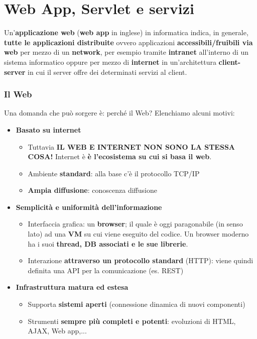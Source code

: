 \documentclass[12pt]{article}
\begin{document}
\section{Web App, Servlet e servizi}
Un'\textbf{applicazione web} (\textbf{web app} in inglese) in informatica indica, in generale, \textbf{tutte le applicazioni distribuite}
ovvero applicazioni \textbf{accessibili/fruibili via web} per mezzo di un \textbf{network}, per esempio tramite \textbf{intranet} all'interno di un sistema informatico
oppure per mezzo di \textbf{internet} in un'architettura \textbf{client-server} in cui il server offre dei determinati servizi al client.
\subsubsection{Il Web}
Una domanda che può sorgere è: perché il Web? Elenchiamo alcuni motivi:
\begin{itemize}
    \item \textbf{Basato su internet}
    \begin{itemize}
        \item Tuttavia \textbf{IL WEB E INTERNET NON SONO LA STESSA COSA!} Internet è \textbf{è l'ecosistema su cui si basa il web}.
        \item Ambiente \textbf{standard}: alla base c'è il protocollo TCP/IP
        \item \textbf{Ampia diffusione}: conoscenza diffusione
    \end{itemize}
    \newpage
    \item \textbf{Semplicità e uniformità dell'informazione}
    \begin{itemize}
        \item Interfaccia grafica: un \textbf{browser}; il quale è oggi paragonabile (in senso lato) ad una \textbf{VM} su cui viene eseguito del codice.
        Un browser moderno ha i suoi \textbf{thread, DB associati e le sue librerie}.
        \item Interazione \textbf{attraverso un protocollo standard} (HTTP): viene quindi definita una API per la comunicazione (es. REST)
    \end{itemize}
    \item \textbf{Infrastruttura matura ed estesa}
    \begin{itemize}
        \item Supporta \textbf{sistemi aperti} (connessione dinamica di nuovi componenti)
        \item Strumenti \textbf{sempre più completi e potenti}: evoluzioni di HTML, AJAX, Web app,...
    \end{itemize}
\end{itemize}
\end{document}
